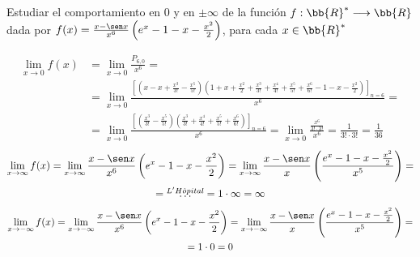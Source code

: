 \begin{ejercicio}
    Estudiar el comportamiento en $0$ y en $\pm \infty$ de la función $f:\bb{R}^\ast \longrightarrow \bb{R}$ dada por $f(x) = \frac{x-\sen x}{x^6} \left( e^x - 1 - x - \frac{x^2}{2} \right)$, para cada $x \in \bb{R}^\ast$

    \begin{equation*}\begin{split}
        \lim_{x\to 0}f(x) & = \lim_{x\to 0} \frac{P_{6, 0}}{x^6} =\\
        & = \lim_{x\to 0} \frac{\left[ \left(x - x + \frac{x^3}{3!} - \frac{x^5}{5!}\right)\left( 1 + x + \frac{x^2}{2} + \frac{x^3}{3!} + \frac{x^4}{4!} + \frac{x^5}{5!} + \frac{x^6}{6!} -1 -x - \frac{x^2}{2} \right) \right]_{n=6}}{x^6} = \\
        & = \lim_{x\to 0} \frac{\left[ \left(\frac{x^3}{3!} - \frac{x^5}{5!}\right)\left( \frac{x^3}{3!} + \frac{x^4}{4!} + \frac{x^5}{5!} + \frac{x^6}{6!}\right) \right]_{n=6}}{x^6} = \lim_{x\to 0} \frac{\frac{x^6}{3! \cdot 3!}}{x^6} = \frac{1}{3! \cdot 3!} = \frac{1}{36}
    \end{split}\end{equation*}
    \begin{multline*}
        \lim_{x\to \infty} f(x)
        = \lim_{x\to \infty} \frac{x-\sen x}{x^6} \left( e^x - 1 - x - \frac{x^2}{2} \right)
        = \lim_{x\to \infty} \frac{x-\sen x}{x} \left( \frac{e^x - 1 - x - \frac{x^2}{2}}{x^5} \right)
        =\\= \;\stackrel{L'H\hat{o}pital}{\dots}\;=  1\cdot \infty = \infty
    \end{multline*}
    \begin{multline*}
        \lim_{x\to -\infty} f(x)
        = \lim_{x\to -\infty} \frac{x-\sen x}{x^6} \left( e^x - 1 - x - \frac{x^2}{2} \right)
        = \lim_{x\to -\infty} \frac{x-\sen x}{x} \left( \frac{e^x - 1 - x - \frac{x^2}{2}}{x^5} \right)
        =\\= 1\cdot 0=0
    \end{multline*}
\end{ejercicio}

